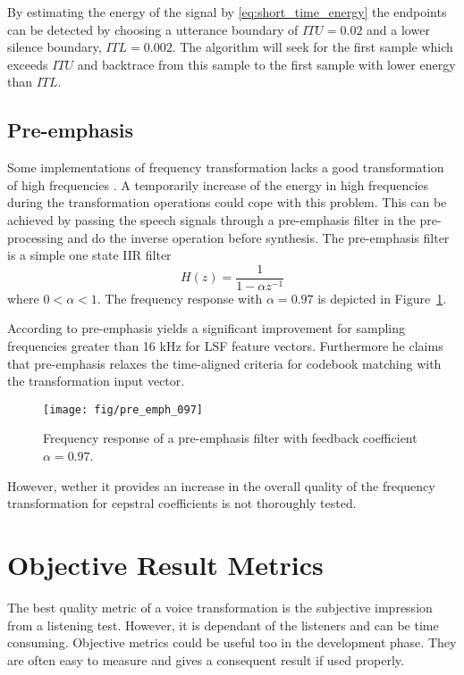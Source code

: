 By estimating the energy of the signal by \eqref{eq:short_time_energy} the endpoints can be detected by choosing a utterance boundary of \eg $ITU=0.02$ and a lower silence boundary, \eg $ITL=0.002$. The algorithm will seek for the first sample which exceeds $ITU$ and backtrace from this sample to the first sample with lower energy than $ITL$.



\subsection{Pre-emphasis} %
\label{sub:pre_emphasis}
Some implementations of frequency transformation lacks a good transformation of high frequencies \cite{turk06}. A temporarily increase of the energy in high frequencies during the transformation operations could cope with this problem. This can be achieved by passing the speech signals through a pre-emphasis filter in the pre-processing and do the inverse operation before synthesis. The pre-emphasis filter is a simple one state IIR filter
\begin{equation}
	\label{eq:pre_emphasis}
	H(z) = \frac{1}{1-\alpha z^{-1}}
\end{equation}
where $0<\alpha < 1$. The frequency response with $\alpha=0.97$ is depicted in Figure~\ref{fig:pre_emph_097}.

According to \cite{turk06} pre-emphasis yields a significant improvement for sampling frequencies greater than 16 kHz for LSF feature vectors. Furthermore he claims that pre-emphasis relaxes the time-aligned criteria for codebook matching with the transformation input vector. 
\begin{figure}[htbp]
	\begin{center}
		\texttt{[image: fig/pre\_emph\_097]}
		\caption{Frequency response of a pre-emphasis filter with 
		feedback coefficient $\alpha=0.97$.}
		\label{fig:pre_emph_097}
	\end{center}
\end{figure}
However, wether it provides an increase in the overall quality of the frequency transformation for cepstral coefficients is not thoroughly tested.


\section{Objective Result Metrics} %
\label{sec:objective_metrics}
The best quality metric of a voice transformation is the subjective impression from a listening test. However, it is dependant of the listeners and can be time consuming. Objective metrics could be useful too in the development phase. They are often easy to measure and gives a consequent result if used properly. 

